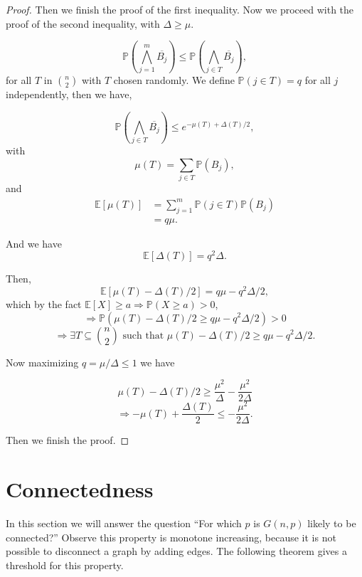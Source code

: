 \documentclass[12pt,twoside,a4paper,bibliography=totocnumbered]{book}
\numberwithin{equation}{section}
\theoremstyle{remark}
\begin{document}
\begin{proof}
Then we finish the proof of the first inequality. Now we proceed with the proof of the second inequality, with $\Delta \geq \mu$.

$$\mathbb{P}(\bigwedge_{j=1}^m \overline{B_j}) \leq \mathbb{P}(\bigwedge_{j \in T} \overline{B_j}),$$
for all $T$ in $\binom{n}{2}$ with $T$ chosen randomly. We define $\mathbb{P}(j \in T) = q$ for all $j$ independently, then we have,

$$ \mathbb{P}(\bigwedge_{j \in T} \overline{B_j}) \leq e^{- \mu(T) + \Delta(T)/2},$$
with
 $$\mu(T) = \sum_{j \in T} \mathbb{P}(B_j),$$
 and
 \begin{align*}
 \mathbb{E} [\mu(T)] &= \sum^m_{j=1} \mathbb{P}(j\in T) \mathbb{P} (B_j)\\
& = q\mu .
 \end{align*}

And we have
 $$ \mathbb{E}[\Delta(T)] = q^2\Delta.$$
 
 Then,
 $$\mathbb{E}[\mu(T) - \Delta(T)/2] = q\mu - q^2 \Delta/2,$$
 which by the fact $\mathbb{E}[X] \geq a \Rightarrow \mathbb{P}(X\geq a) > 0$,
 $$\Rightarrow \mathbb{P}(\mu(T) - \Delta(T)/2 \geq q\mu - q^2 \Delta / 2) > 0$$
 $$\Rightarrow \exists T \subseteq \binom{n}{2}\text{ such that } \mu(T) - \Delta(T)/2 \geq q\mu - q^2 \Delta / 2 .$$
 
Now maximizing $q = \mu / \Delta \leq 1$ we have

 $$ \mu(T) - \Delta(T)/2 \geq \frac{\mu^2}{\Delta} - \frac{\mu^2}{2\Delta}$$
 $$\Rightarrow -\mu(T) + \frac{\Delta(T)}{2} \leq -\frac{\mu^2}{2\Delta}.$$
 
 Then we finish the proof.
 
\end{proof}

\section{Connectedness}
In this section we will answer the question ``For which $p$ is $G(n,p)$ likely to be connected?'' Observe this property is monotone increasing, because it is not possible to disconnect a graph by adding edges. The following theorem gives a threshold for this property.
\end{document}
